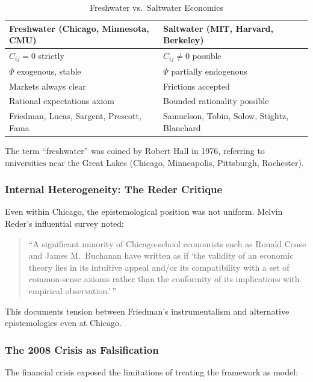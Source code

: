 \begin{table}[htbp]
\centering
\caption{Freshwater vs.\ Saltwater Economics}
\label{tab:freshwater-saltwater}
\renewcommand{\arraystretch}{1.3}
\small
\begin{tabular}{@{}p{5.5cm}p{5.5cm}@{}}
\toprule
\textbf{Freshwater (Chicago, Minnesota, CMU)} & \textbf{Saltwater (MIT, Harvard, Berkeley)} \\
\midrule
$C_{ij} = 0$ strictly & $C_{ij} \neq 0$ possible \\
$\Psi$ exogenous, stable & $\Psi$ partially endogenous \\
Markets always clear & Frictions accepted \\
Rational expectations axiom & Bounded rationality possible \\
\midrule
Friedman, Lucas, Sargent, Prescott, Fama & Samuelson, Tobin, Solow, Stiglitz, Blanchard \\
\bottomrule
\end{tabular}
\end{table}

The term ``freshwater'' was coined by Robert Hall in 1976, referring to universities
near the Great Lakes (Chicago, Minneapolis, Pittsburgh, Rochester).

\subsubsection{Internal Heterogeneity: The Reder Critique}

Even within Chicago, the epistemological position was not uniform.
Melvin Reder's influential survey noted:

\begin{quote}
``A significant minority of Chicago-school economists such as Ronald Coase and
James M.\ Buchanan have written as if `the validity of an economic theory lies in
its intuitive appeal and/or its compatibility with a set of common-sense axioms
rather than the conformity of its implications with empirical observation.'\,''
\citep{reder1982}
\end{quote}

This documents tension between Friedman's instrumentalism and alternative
epistemologies even at Chicago.

\subsubsection{The 2008 Crisis as Falsification}

The financial crisis exposed the limitations of treating the framework as model:

